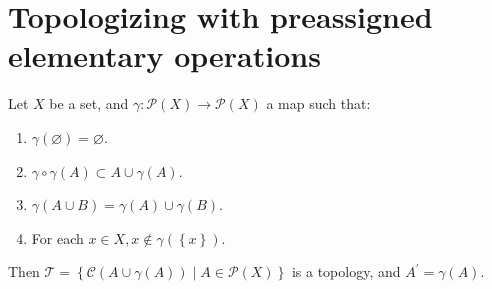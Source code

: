 \section{Topologizing with preassigned elementary operations}

\begin{proposition}{5.2}
	Let \(X\) be a set, and \( \gamma: \mathscr{P}(X) \to \mathscr{P}(X) \) a map such that:
	\begin{enumerate}[label={(\arabic*)}]
		\item \( \gamma(\varnothing) = \varnothing \).
		\item \( \gamma \circ \gamma (A) \subset A \cup \gamma(A) \).
		\item \( \gamma(A \cup B) = \gamma(A) \cup \gamma(B) \).
		\item For each \( x \in X, x \notin \gamma(\left\{x\right\}) \).
	\end{enumerate}

	Then \( \mathscr{T} = \left\{ \mathscr{C}(A \cup \gamma(A)) \mid A \in \mathscr{P}(X) \right\} \) is a topology, and \( A^{\prime} = \gamma(A) \).
\end{proposition}

